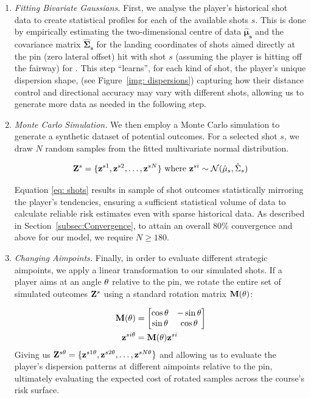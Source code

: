\documentclass[11pt, letterpaper]{article}
\begin{document}
\begin{enumerate}
    \item \textit{Fitting Bivariate Gaussians.} First, we analyse the player's historical shot data to create statistical profiles for each of the available shots $s$. This is done by empirically estimating the two-dimensional centre of data $\mathbf{\hat\mu_s}$ and the covariance matrix $\mathbf{\hat\Sigma_s}$ for the landing coordinates of shots aimed directly at the pin (zero lateral offset) hit with shot $s$ (assuming the player is hitting off the fairway) for . This step ``learns'', for each kind of shot, the player's unique dispersion shape, (see Figure~\ref{img: dispersions}) capturing how their distance control and directional accuracy may vary with different shots, allowing us to generate more data as needed in the following step.
     \item \textit{Monte Carlo Simulation.} We then employ a Monte Carlo simulation to generate a synthetic dataset of potential outcomes. For a selected shot $s$, we draw $N$ random samples from the fitted multivariate normal distribution. 


     \begin{equation}
         \label{eq: shots}
         \mathbf{Z}^s = \{\mathbf{z}^{s1}, \mathbf{z}^{s2}, \ldots, \mathbf{z}^{sN}\} \text{ where } \mathbf{z}^{si} \sim \mathcal{N}(\hat\mu_s, \hat\Sigma_s)
     \end{equation}

     Equation \eqref{eq: shots} results in sample of shot outcomes statistically mirroring the player's tendencies,  ensuring a sufficient statistical volume of data to calculate reliable risk estimates even with sparse historical data. 
     As described in Section~\ref{subsec:Convergence}, to attain an overall 80\% convergence and above for our model, we require $N \geq 180$.

     \item \textit{Changing Aimpoints.} Finally, in order to evaluate different strategic aimpoints, we apply a linear transformation to our simulated shots. If a player aims at an angle $\theta$ relative to the pin, we rotate the entire set of simulated outcomes $\mathbf{Z}^s$ using a standard rotation matrix $\mathbf{M} (\theta)$: 

     \begin{align}
         \mathbf{M} (\theta) &= \begin{bmatrix}
             \cos \theta & - \sin \theta \\
             \sin \theta & \cos \theta
         \end{bmatrix} \\
         \mathbf{z}^{si\theta} &= \mathbf{M}(\theta)\mathbf{z}^{si}
     \end{align}
     Giving us $\mathbf{Z}^{s\theta} =  \{\mathbf{z}^{s1\theta}, \mathbf{z}^{s2\theta}, \ldots, \mathbf{z}^{sN\theta}\}$ and allowing us to evaluate the player's dispersion patterns at different aimpoints relative to the pin, ultimately evaluating the expected cost of rotated samples across the course's risk surface.
\end{enumerate}
\end{document}
